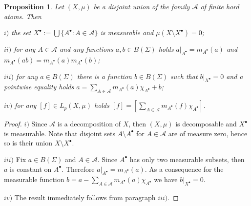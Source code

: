 \documentclass[12pt]{article}
\newtheorem{proposition}[theorem]{Proposition}
\begin{document}
\begin{proposition}\label{HardAtomicMeasProp} Let $(X,\mu)$ be a disjoint union of the family $\mathcal{A}$ of finite hard atoms. Then

    $i)$ the set $X^\bullet:=\bigcup \{A^\bullet:A\in\mathcal{A}\}$ is measurable and $\mu(X\setminus X^\bullet)=0$;

    $ii)$ for any $A\in\mathcal{A}$ and any functions $a,b\in B(\Sigma)$ holds $a|_{A^\bullet}=m_{A^\bullet}(a)$ and $m_{A^\bullet}(ab)=m_{A^\bullet}(a)m_{A^\bullet}(b)$;

    $iii)$ for any $a\in B(\Sigma)$ there is a function $b\in B(\Sigma)$ such that $b|_{X^\bullet}=0$ and a pointwise equality holds $a=\sum_{A\in\mathcal{A}} m_{A^\bullet}(a)\chi_{A^\bullet} + b$;

    $iv)$ for any $[f]\in L_p(X,\mu)$ holds $[f]=[\sum_{A\in\mathcal{A}} m_{A^\bullet}(f)\chi_{A^\bullet}]$.
\end{proposition}
\begin{proof} $i)$ Since $\mathcal{A}$ is a decomposition of $X$, then $(X,\mu)$ is decomposable and $X^\bullet$ is measurable. Note that disjoint sets $A\setminus A^\bullet$ for $A\in\mathcal{A}$ are of measure zero, hence so is their union $X\setminus X^\bullet$.

    $iii)$ Fix $a\in B(\Sigma)$ and $A\in \mathcal{A}$. Since $A^\bullet$ has only two measurable subsets, then $a$ is constant on $A^\bullet$. Therefore $a|_{A^\bullet}=m_{A^\bullet}(a)$. As a consequence for the measurable function $b=a-\sum_{A\in\mathcal{A}}m_{A^\bullet}(a)\chi_{A^\bullet}$ we have $b|_{X^\bullet}=0$.

    $iv)$ The result immediately follows from paragraph $iii)$.
\end{proof}
\end{document}

